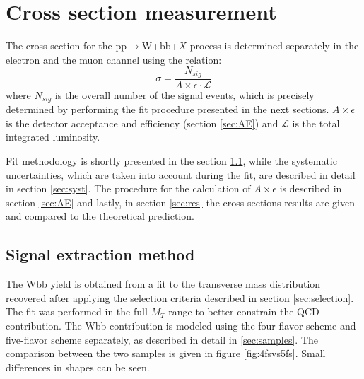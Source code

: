 \chapter{Cross section measurement} %

\label{Chapter7} %



The cross section for the pp$\rightarrow$W+bb+$X$ process is determined separately in the electron and the muon channel using the relation:
\begin{equation}
\sigma = \frac{N_{sig}}{A\times \epsilon \cdot \mathcal{L}}
\label{equ:xsec}
\end{equation}
where $N_{sig}$ is the overall number of the signal events, which is precisely determined by performing the fit procedure presented in the next sections. $A\times \epsilon$ is the detector acceptance and efficiency (section \ref{sec:AE}) and $\mathcal{L}$ is the total integrated luminosity. 
\par Fit methodology is shortly presented in the section \ref{sec:fit}, while the systematic uncertainties, which are taken into account during the fit, are described in detail in section \ref{sec:syst}. The procedure for the calculation of $A\times \epsilon$ is described in section \ref{sec:AE} and lastly, in section \ref{sec:res} the cross sections results are given and compared to the theoretical prediction. 


\section{Signal extraction method}
\label{sec:fit}

The Wbb yield is obtained from a fit to the transverse mass distribution recovered after applying the selection criteria described in section \ref{sec:selection}. The fit was performed in the full $M_T$ range to better constrain the QCD contribution.  
The Wbb contribution is modeled using the four-flavor scheme and five-flavor scheme separately, as described in detail in \ref{sec:samples}. The comparison between the two samples is given in figure \ref{fig:4fsvs5fs}. Small differences in shapes can be seen.

